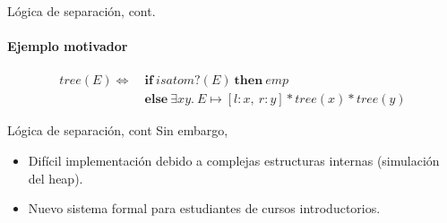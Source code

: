 \begin{frame}{Lógica de separación, cont.}
\framesubtitle{Ejemplo motivador}

\begin{align*}
  tree(E) \Longleftrightarrow\ &\boldsymbol{if}\ isatom?(E)\ \boldsymbol{then}\ emp \\
             &\boldsymbol{else}\ \exists xy.\ E\mapsto[l: x,\ r: y] * tree(x) * tree(y) \nonumber
\end{align*}

\end{frame}

\begin{frame}{Lógica de separación, cont}
Sin embargo,
\begin{itemize}
  \item Difícil implementación debido a complejas estructuras internas (simulación del heap).
  \item Nuevo sistema formal para estudiantes de cursos introductorios. 
\end{itemize}
\end{frame}

